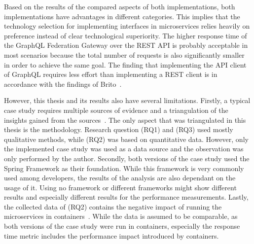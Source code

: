 Based on the results of the compared aspects of both implementations, both implementations have advantages in different categories.
This implies that the technology selection for implementing interfaces in microservices relies heavily on preference instead of clear technological superiority.
The higher response time of the GraphQL Federation Gateway over the \ac{REST} \ac{API} is probably acceptable in most scenarios because the total number of requests is also significantly smaller in order to achieve the same goal.
The finding that implementing the \ac{API} client of GraphQL requires less effort than implementing a \ac{REST} client is in accordance with the findings of Brito~\cite{Brito2020}.

However, this thesis and its results also have several limitations.
Firstly, a typical case study requires multiple sources of evidence and a triangulation of the insights gained from the sources~\cite{Runeson2012}.
The only aspect that was triangulated in this thesis is the methodology.
Research question (\acs{RQ}1) and (\acs{RQ}3) used mostly qualitative methods, while (\acs{RQ}2) was based on quantitative data.
However, only the implemented case study was used as a data source and the observation was only performed by the author.
Secondly, both versions of the case study used the Spring Framework as their foundation.
While this framework is very commonly used among developers, the results of the analysis are also dependant on the usage of it.
Using no framework or different frameworks might show different results and especially different results for the performance measurements.
Lastly, the collected data of (\acs{RQ}2) contains the negative impact of running the microservices in containers~\cite{Kratzke2017}.
While the data is assumed to be comparable, as both versions of the case study were run in containers, especially the response time metric includes the performance impact introduced by containers.

